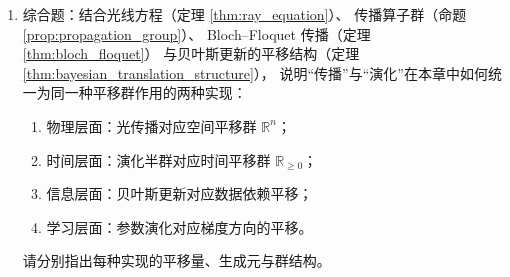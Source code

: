 \begin{enumerate}[leftmargin=3em, label=\textbf{题 \arabic*}]
    \item 综合题：结合光线方程（定理 \ref{thm:ray_equation}）、
    传播算子群（命题 \ref{prop:propagation_group}）、
    Bloch--Floquet 传播（定理 \ref{thm:bloch_floquet}）
    与贝叶斯更新的平移结构（定理 \ref{thm:bayesian_translation_structure}），
    说明“传播”与“演化”在本章中如何统一为同一种平移群作用的两种实现：
    \begin{enumerate}[label=(\roman*)]
        \item 物理层面：光传播对应空间平移群 $\mathbb{R}^n$；
        \item 时间层面：演化半群对应时间平移群 $\mathbb{R}_{\ge0}$；
        \item 信息层面：贝叶斯更新对应数据依赖平移；
        \item 学习层面：参数演化对应梯度方向的平移。
    \end{enumerate}
    请分别指出每种实现的平移量、生成元与群结构。
\end{enumerate}


